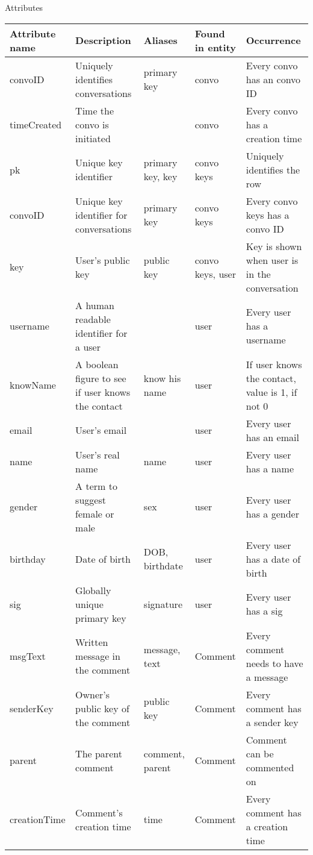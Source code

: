 Attributes
\begin{center}
    \begin{tabular}{| l | l | l | l | l |}
    \hline
    Attribute name         & Description                             & Aliases             & Found in entity            & Occurrence          \\ \hline

    convoID 	 & Uniquely identifies conversations & primary key & convo & Every convo has an convo ID     \\ \hline
    timeCreated  & Time the convo is initiated       &             & convo & Every convo has a creation time \\ \hline

    pk 			 & Unique key identifier			       & primary key, key & convo keys       & Uniquely identifies the row                   \\ \hline
    convoID		 & Unique key identifier for conversations & primary key      & convo keys       & Every convo keys has a convo ID               \\ \hline
    key          & User's public key 					   & public key       & convo keys, user & Key is shown when user is in the conversation \\ \hline

    username     & A human readable identifier for a user             & 	           & user   & Every user has a username \\ \hline
    knowName     & A boolean figure to see if user knows the contact  & know his name  & user   & If user knows the contact, value is 1, if not 0  \\ \hline
    email        & User's email	                                      &                & user   & Every user has an email \\ \hline
    name         & User's real name						              & name           & user   & Every user has a name \\ \hline
    gender       & A term to suggest female or male                   & sex            & user   & Every user has a gender\\ \hline
    birthday     & Date of birth 							          & DOB, birthdate & user   & Every user has a date of birth \\ \hline
    sig          & Globally unique primary key & signature & user & Every user has a sig \\ \hline

    msgText 	 & Written message in the comment      & message, text      & Comment    & Every comment needs to have a message \\ \hline
    senderKey  	 & Owner's public key of the comment   & public key         & Comment    & Every comment has a sender key \\ \hline
    parent		 & The parent comment                  & comment, parent    & Comment    & Comment can be commented on \\ \hline
    creationTime & Comment's creation time             & time               & Comment    & Every comment has a creation time \\ \hline


\end{tabular}
\end{center}
